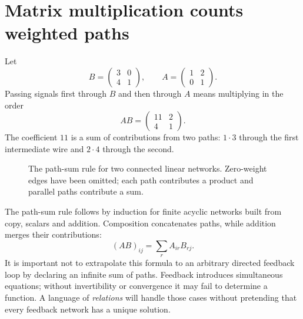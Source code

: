 \section{Matrix multiplication counts weighted paths}

Let
\[
 B=\begin{pmatrix}3&0\\4&1\end{pmatrix},\qquad
 A=\begin{pmatrix}1&2\\0&1\end{pmatrix}.
\]
Passing signals first through \(B\) and then through \(A\) means multiplying in the order
\[
 AB=\begin{pmatrix}11&2\\4&1\end{pmatrix}.
\]
The coefficient \(11\) is a sum of contributions from two paths: \(1\cdot3\) through the first intermediate wire and \(2\cdot4\) through the second.

\begin{figure}[H]
\centering
{}
\caption{The path-sum rule for two connected linear networks. Zero-weight edges have been omitted; each path contributes a product and parallel paths contribute a sum.}
\end{figure}

The path-sum rule follows by induction for finite acyclic networks built from copy, scalars and addition. Composition concatenates paths, while addition merges their contributions:
\[
 (AB)_{ij}=\sum_r A_{ir}B_{rj}.
\]
It is important not to extrapolate this formula to an arbitrary directed feedback loop by declaring an infinite sum of paths. Feedback introduces simultaneous equations; without invertibility or convergence it may fail to determine a function. A language of \emph{relations} will handle those cases without pretending that every feedback network has a unique solution.

